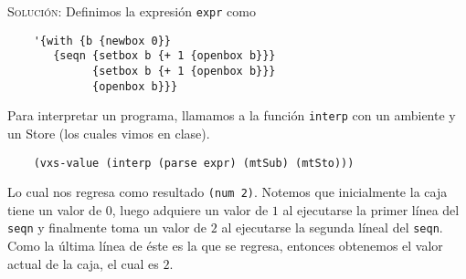 \documentclass[letterpaper,11pt]{article}
\begin{document}
\begin{enumerate}
    \textsc{Solución:} Definimos la expresión \texttt{expr} como 
    \begin{verbatim}
    '{with {b {newbox 0}}
       {seqn {setbox b {+ 1 {openbox b}}}
             {setbox b {+ 1 {openbox b}}}
             {openbox b}}}
    \end{verbatim}
    
    Para interpretar un programa, llamamos a la función \texttt{interp} 
    con un ambiente y un Store (los cuales vimos en clase).
    \begin{verbatim}
    (vxs-value (interp (parse expr) (mtSub) (mtSto)))
    \end{verbatim}

    Lo cual nos regresa como resultado \texttt{(num 2)}. Notemos que inicialmente
    la caja tiene un valor de $0$, luego adquiere un valor de $1$ al ejecutarse 
    la primer línea del \texttt{seqn} y finalmente toma un valor de $2$ al 
    ejecutarse la segunda líneal del \texttt{seqn}. Como la última línea de 
    éste es la que se regresa, entonces obtenemos el valor actual de la caja, 
    el cual es $2$.
\end{enumerate}
\end{document}
